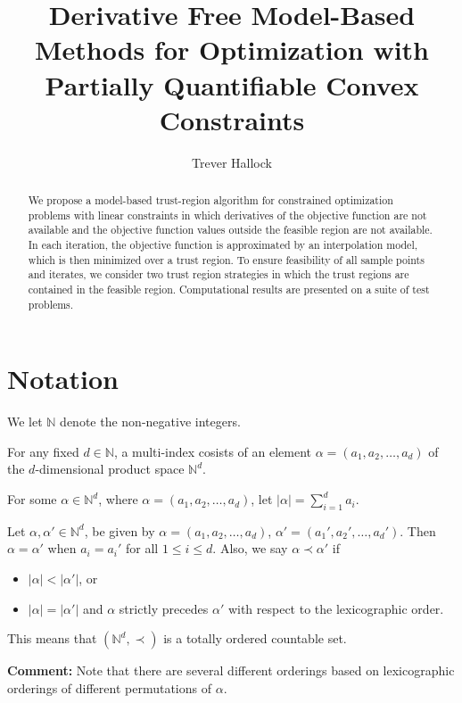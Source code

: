 \documentclass{article}
\title{Derivative Free Model-Based Methods for Optimization with Partially Quantifiable Convex Constraints}
\author{Trever Hallock}
\newenvironment{comment}
  {\par\medskip
   \color{red}%
   \begin{framed}
   \textbf{Comment: }\ignorespaces}
 {\end{framed}
  \medskip}
\theoremstyle{case}
\newcommand{\naturals}{\mathbb N}
\newcommand{\natsd}{\naturals^d}
\begin{document}
\maketitle

\begin{abstract}

We propose a model-based trust-region algorithm for constrained optimization problems with linear constraints in which derivatives of the objective function are not available and the objective function values outside the feasible region are not available.
In each iteration, the objective function is approximated by an interpolation model, which is then minimized over a trust region.
To ensure feasibility of all sample points and iterates, we consider two trust region strategies in which the trust regions are contained in the feasible region.
Computational results are presented on a suite of test problems.

\end{abstract}

\newpage

\tableofcontents

\newpage




\section{Notation}
We let $\naturals$ denote the non-negative integers.

For any fixed $d \in \naturals$, a multi-index cosists of an element $\alpha = (a_1, a_2, \ldots, a_d)$ of the $d$-dimensional product space $\natsd$.

For some $\alpha \in \natsd $, where $\alpha = (a_1, a_2, \ldots, a_d)$, let $|\alpha| = \sum_{i=1}^d a_i$.

Let $\alpha, \alpha' \in \natsd $, be given by $\alpha = (a_1, a_2, \ldots, a_d)$, $\alpha' = (a_1', a_2', \ldots, a_d')$.
Then $\alpha = \alpha'$ when $a_i = a_i'$ for all $1 \le i \le d$.
Also, we say $\alpha \prec \alpha'$ if
\begin{itemize}
\item $|\alpha| < |\alpha'|$, or
\item $|\alpha| = |\alpha'|$ and $\alpha$ strictly precedes $\alpha'$ with respect to the lexicographic order.
\end{itemize}
This means that $\left(\natsd, \prec\right)$ is a totally ordered countable set.
\begin{comment}
Note that there are several different orderings based on lexicographic orderings of different permutations of $\alpha$.
\end{comment}
\end{document}
